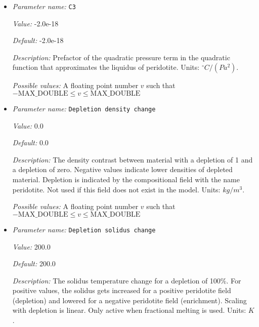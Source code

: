 \begin{itemize}
{\it Default:} 4.50e-8


{\it Description:} Prefactor of the linear pressure term in the quadratic function that approximates the liquidus of peridotite. Units: ${}^\circ C/Pa$.


{\it Possible values:} A floating point number $v$ such that $-\text{MAX\_DOUBLE} \leq v \leq \text{MAX\_DOUBLE}$
\item {\it Parameter name:} {\tt C3}
\label{parameters:Material model/Melt simple/C3}


{\it Value:} -2.0e-18


{\it Default:} -2.0e-18


{\it Description:} Prefactor of the quadratic pressure term in the quadratic function that approximates the liquidus of peridotite. Units: ${}^\circ C/(Pa^2)$.


{\it Possible values:} A floating point number $v$ such that $-\text{MAX\_DOUBLE} \leq v \leq \text{MAX\_DOUBLE}$
\item {\it Parameter name:} {\tt Depletion density change}
\label{parameters:Material model/Melt simple/Depletion density change}


{\it Value:} 0.0


{\it Default:} 0.0


{\it Description:} The density contrast between material with a depletion of 1 and a depletion of zero. Negative values indicate lower densities of depleted material. Depletion is indicated by the compositional field with the name peridotite. Not used if this field does not exist in the model. Units: $kg/m^3$.


{\it Possible values:} A floating point number $v$ such that $-\text{MAX\_DOUBLE} \leq v \leq \text{MAX\_DOUBLE}$
\item {\it Parameter name:} {\tt Depletion solidus change}
\label{parameters:Material model/Melt simple/Depletion solidus change}


{\it Value:} 200.0


{\it Default:} 200.0


{\it Description:} The solidus temperature change for a depletion of 100\%. For positive values, the solidus gets increased for a positive peridotite field (depletion) and lowered for a negative peridotite field (enrichment). Scaling with depletion is linear. Only active when fractional melting is used. Units: $K$.



\end{itemize}
